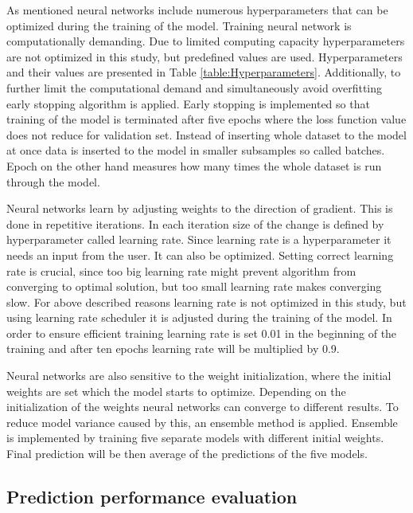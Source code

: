\documentclass[12pt]{article}
\begin{document}
As mentioned neural networks include numerous hyperparameters that can be optimized during the training of the model. Training neural network is computationally demanding. Due to limited computing capacity hyperparameters are not optimized in this study, but predefined values are used. Hyperparameters and their values are presented in Table \ref{table:Hyperparameters}. Additionally, to further limit the computational demand and simultaneously avoid overfitting early stopping algorithm is applied. Early stopping is implemented so that training of the model is terminated after five epochs where the loss function value does not reduce for validation set. Instead of inserting whole dataset to the model at once data is inserted to the model in smaller subsamples so called batches. Epoch on the other hand measures how many times the whole dataset is run through the model. \par

Neural networks learn by adjusting weights to the direction of gradient. This is done in repetitive iterations. In each iteration size of the change is defined by hyperparameter called learning rate. Since learning rate is a hyperparameter it needs an input from the user. It can also be optimized. Setting correct learning rate is crucial, since too big learning rate might prevent algorithm from converging to optimal solution, but too small learning rate makes converging slow. For above described reasons learning rate is not optimized in this study, but using learning rate scheduler it is adjusted during the training of the model. In order to ensure efficient training learning rate is set 0.01 in the beginning of the training and after ten epochs learning rate will be multiplied by 0.9. \par

Neural networks are also sensitive to the weight initialization, where the initial weights are set which the model starts to optimize. Depending on the initialization of the weights neural networks can converge to different results. To reduce model variance caused by this, an ensemble method is applied. Ensemble is implemented by training five separate models with different initial weights. Final prediction will be then average of the predictions of the five models. \par

\subsection{Prediction performance evaluation}\label{PredictionPerformanceEvaluation}
\end{document}

